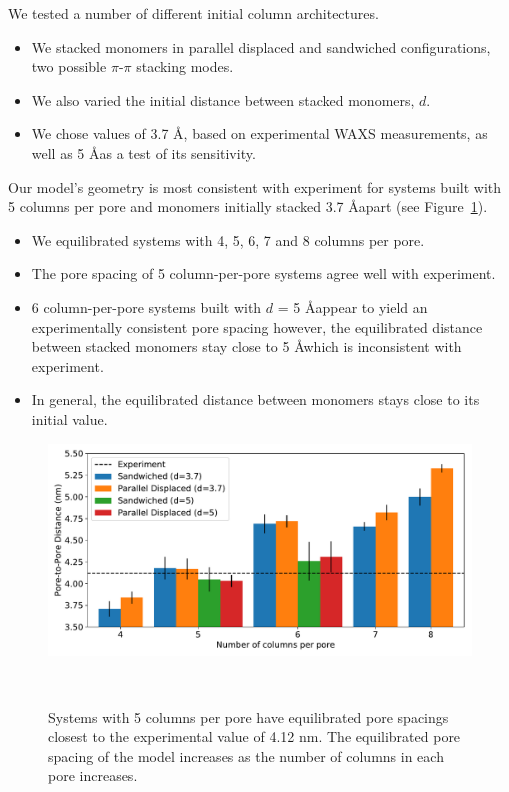\documentclass{article}
\begin{document}
  \noindent We tested a number of different initial column architectures. 
  \begin{itemize}
      \item We stacked monomers in parallel displaced and sandwiched 
      configurations, two possible $\pi$-$\pi$ stacking modes.
      \item We also varied the initial distance between stacked monomers, $d$.
      \item We chose values of 3.7 \AA, based on experimental WAXS 
      measurements, as well as 5 \AA as a test of its sensitivity.
  \end{itemize}
  
  \noindent Our model's geometry is most consistent with experiment for systems
  built with 5 columns per pore and monomers initially stacked 3.7 \AA apart
  (see Figure~\ref{fig:p2p}). 
  \begin{itemize}
    \item We equilibrated systems with 4, 5, 6, 7 and 8 columns per pore.
    \item The pore spacing of 5 column-per-pore systems agree well with experiment.
    \item 6 column-per-pore systems built with $d$ = 5 \AA appear to yield an
    experimentally consistent pore spacing however, the equilibrated distance
    between stacked monomers stay close to 5 \AA which is inconsistent with 
    experiment. 
    \item In general, the equilibrated distance between monomers stays close to
    its initial value. 
  \end{itemize}
  
  \begin{figure}[!htb]
    \centering
    \includegraphics[width=\linewidth]{p2p.pdf}
    \caption{Systems with 5 columns per pore have equilibrated pore spacings
            closest to the experimental value of 4.12 nm. The equilibrated 
            pore spacing of the model increases as the number of columns in
            each pore increases.}~\label{fig:p2p}
  \end{figure}
  
\end{document}

